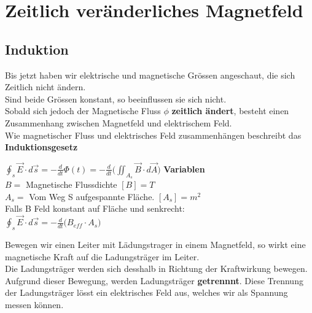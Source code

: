 




\newpage

\section{Zeitlich veränderliches Magnetfeld}

\subsection{Induktion}

Bis jetzt haben wir elektrische und magnetische Grössen angeschaut, die sich Zeitlich nicht ändern. \\
Sind beide Grössen konstant, so beeinflussen sie sich nicht. \\
Sobald sich jedoch der Magnetische Fluss $\phi$  \textbf{zeitlich ändert}, besteht einen Zusammenhang zwischen Magnetfeld und elektrischem Feld. \\
Wie magnetischer Fluss und elektrisches Feld zusammenhängen beschreibt das \textbf{Induktionsgesetz}


\begingl
\formulaBegin
  $\displaystyle \oint_s \vec{E}\cdot d\vec{s} = -\frac{d}{dt}\Phi(t) =  -\frac{d}{dt} \big ( \iint_{A_s} \vec{B} \cdot d\vec{A} \big )$
\formulaEnd
\textbf{Variablen} \\
$B = $ Magnetische Flussdichte $[B] = T$\\
$A_s = $ Vom Weg S aufgespannte Fläche. $[A_s] = m^2$ \\

Falls B Feld konstant auf Fläche und senkrecht: \\

\formulaBegin
  $\displaystyle  \oint_s \vec{E}\cdot d\vec{s} = -\frac{d}{dt} \big ( B_{eff} \cdot A_s \big ) $
\formulaEnd
\iend


\newpage

Bewegen wir einen Leiter mit Lädungstrager in einem Magnetfeld, so wirkt eine magnetische Kraft auf die Ladungsträger im Leiter. \\
Die Ladungsträger werden sich desshalb in Richtung der Kraftwirkung bewegen. \\
Aufgrund dieser Bewegung, werden Ladungsträger \textbf{getrennnt}. Diese Trennung der Ladungsträger lösst ein elektrisches Feld aus, welches wir als Spannung messen können.


